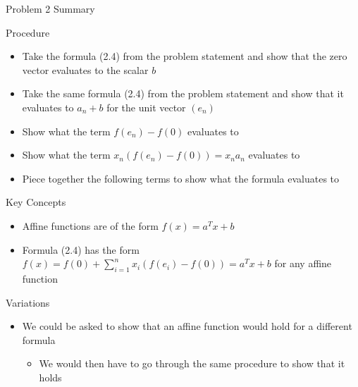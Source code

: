 \begin{summary}{Problem 2 Summary}
    \begin{statement}{Procedure}
        \begin{itemize}
            \item Take the formula (2.4) from the problem statement and show that the zero vector evaluates to the scalar $b$
            \item Take the same formula (2.4) from the problem statement and show that it evaluates to $a_{n} + b$ for the unit vector $(e_{n})$
            \item Show what the term $f(e_{n}) - f(0)$ evaluates to
            \item Show what the term $x_{n}(f(e_{n}) - f(0)) = x_{n}a_{n}$ evaluates to
            \item Piece together the following terms to show what the formula evaluates to
        \end{itemize}
    \end{statement}
    \begin{statement}{Key Concepts}
        \begin{itemize}
            \item Affine functions are of the form $f(x) = a^{T}x + b$
            \item Formula (2.4) has the form $f(x) = f(0) + \sum^{n}_{i = 1} x_{i}(f(e_{i}) - f(0)) = a^{T}x + b$ for any affine function
        \end{itemize}
    \end{statement}
    \begin{statement}{Variations}
        \begin{itemize}
            \item We could be asked to show that an affine function would hold for a different formula
            \begin{itemize}
                \item We would then have to go through the same procedure to show that it holds
            \end{itemize}
        \end{itemize}
    \end{statement}
\end{summary}

